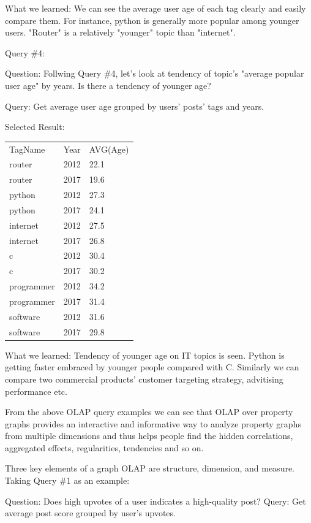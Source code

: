 What we learned:	We can see the average user age of each tag clearly and easily compare them. For instance, python is generally more popular among younger users. "Router" is a relatively "younger" topic than "internet". 

Query \#4:

Question: 	Follwing Query \#4, let’s look at tendency of topic’s "average popular user age" by years. Is there a tendency of younger age?

Query: 		Get average user age grouped by users’ posts’ tags and years. 

Selected Result:

\begin {center}
\begin{tabular}{ l l  l}
	
	TagName&Year&AVG(Age)\\router&2012&22.1\\router&2017&19.6\\python&2012&27.3\\python&2017&24.1\\internet&2012&27.5\\internet&2017&26.8\\c&2012&30.4\\c&2017&30.2\\programmer&2012&34.2\\programmer&2017&31.4\\software&2012&31.6\\software&2017&29.8\\
	
\end{tabular}
\end {center}

What we learned:	Tendency of younger age on IT topics is seen. 
Python is getting faster embraced by younger people compared with C. Similarly we can compare two commercial products’ customer targeting strategy, advitising performance etc. 

From the above OLAP query examples we can see that OLAP over property graphs provides an interactive and informative way to analyze property graphs from multiple dimensions and thus helps people find the hidden correlations, aggregated effects, regularities, tendencies and so on.  




Three key elements of a graph OLAP are structure, dimension, and measure. Taking Query \#1 as an example: 
 
Question: 	Does high upvotes of a user indicates a high-quality post? 
Query: 		Get average post score grouped by user’s upvotes. 
 
